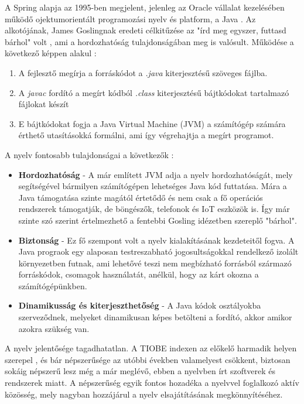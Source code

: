 \documentclass[12pt]{article}
\begin{document}
A Spring alapja az 1995-ben megjelent, jelenleg az Oracle vállalat kezelésében működő ojektumorientált programozási nyelv és platform, a Java \cite{JAVA_ABOUT}. Az alkotójának, James Goslingnak eredeti célkitűzése az "írd meg egyszer, futtasd bárhol" volt \cite{JAVA_BOOK}, ami a hordozhatóság tulajdonságában meg is valósult. Működése a következő képpen alakul \cite{ORACLE_JAVA}:
\begin{enumerate}
\item A fejlesztő megírja a forráskódot a \textit{.java} kiterjesztésű szöveges fájlba.
\item A \textit{javac} fordító a megírt kódból \textit{.class} kiterjesztésű bájtkódokat tartalmazó fájlokat készít
\item E bájtkódokat fogja a Java Virtual Machine (JVM) a számítógép számára érthető utasításokká formálni, ami így végrehajtja a megírt programot.
\end{enumerate}

A nyelv fontosabb tulajdonságai a következők \cite{JAVA_BOOK}:
\begin{itemize}
	\item[]\textbf{Hordozhatóság}
	- A már említett JVM adja a nyelv hordozhatóságát, mely segítségével bármilyen számítógépen lehetséges Java kód futtatása. Mára a Java támogatása szinte magától értetődő és nem csak a fő operációs rendszerek támogatják, de böngészők, telefonok és IoT eszközök is. Így már szinte szó szerint értelmezhető a fentebbi Gosling idézetben szereplő "bárhol".
	\item[]\textbf{Biztonság}
	- Ez fő szempont volt a nyelv kialakításának kezdeteitől fogva. A Java prograok egy alaposan testreszabható jogosultságokkal rendelkező izolált környezetben futnak, ami lehetővé teszi nem megbízható forrásból származó forráskódok, csomagok használatát, anélkül, hogy az kárt okozna a számítógépünkben.
	\item[]\textbf{Dinamikusság és kiterjeszthetőség}
	- A Java kódok osztályokba szerveződnek, melyeket dinamikusan képes betölteni a fordító, akkor amikor azokra szükség van.
\end{itemize}

A nyelv jelentősége tagadhatatlan. A TIOBE indexen az előkelő harmadik helyen szerepel \cite{TIO}, és bár népszerűsége az utóbbi években valamelyest csökkent, biztosan sokáig népszerű lesz még a már meglévő, ebben a nyelvben írt szoftverek és rendszerek miatt. A népszerűség egyik fontos hozadéka a nyelvvel foglalkozó aktív közösség, mely nagyban hozzájárul a nyelv elsajátításának megkönnyítéséhez.
\end{document}
